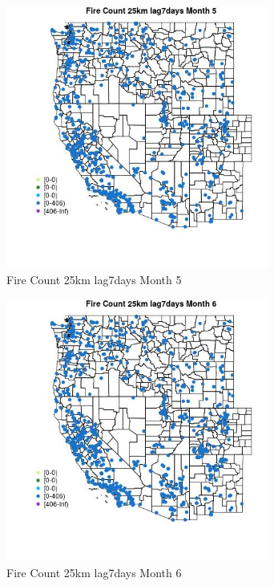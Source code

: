\begin{figure} 
\centering  
\includegraphics[width=0.77\textwidth]{Code_Outputs/Report_ML_input_PM25_Step4_part_f_de_duplicated_aves_prioritize_24hr_obswNAs_MapObsMo5Fire_Count_25km_lag7days.jpg} 
\caption{\label{fig:Report_ML_input_PM25_Step4_part_f_de_duplicated_aves_prioritize_24hr_obswNAsMapObsMo5Fire_Count_25km_lag7days}Fire Count 25km lag7days Month 5} 
\end{figure} 
 

\begin{figure} 
\centering  
\includegraphics[width=0.77\textwidth]{Code_Outputs/Report_ML_input_PM25_Step4_part_f_de_duplicated_aves_prioritize_24hr_obswNAs_MapObsMo6Fire_Count_25km_lag7days.jpg} 
\caption{\label{fig:Report_ML_input_PM25_Step4_part_f_de_duplicated_aves_prioritize_24hr_obswNAsMapObsMo6Fire_Count_25km_lag7days}Fire Count 25km lag7days Month 6} 
\end{figure} 
 

